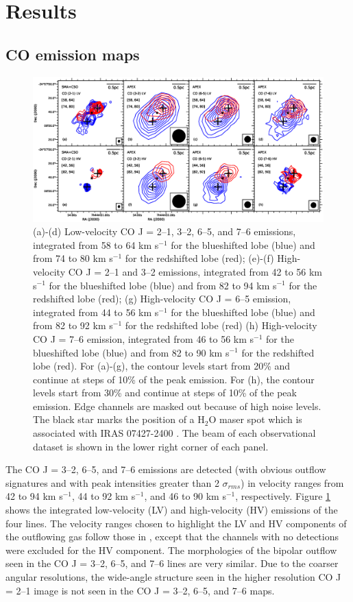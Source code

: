 \section{Results}
\subsection{CO emission maps}

\begin{figure}[htbp]
\includegraphics[scale=.65]{./fig/ori_contourall.eps}
\caption{(a)-(d) Low-velocity CO J = 2--1, 3--2, 6--5, and 7--6 emissions, integrated from 58 to 64 km s$^{-1} $ for the blueshifted lobe (blue) and from 74 to 80 km s$^{-1}$ for the redshifted lobe (red); (e)-(f) High-velocity CO J = 2--1 and 3--2 emissions,  integrated from 42 to 56 km s$^{-1} $ for the blueshifted lobe (blue) and from 82 to 94 km s$^{-1}$ for the redshifted lobe (red); (g) High-velocity CO J = 6--5 emission, integrated from 44 to 56 km s$^{-1} $ for the blueshifted lobe (blue) and from 82 to 92 km s$^{-1}$ for the redshifted lobe (red) (h) High-velocity CO J = 7--6 emission, integrated from 46 to 56 km s$^{-1} $ for the blueshifted lobe (blue) and from 82 to 90 km s$^{-1}$ for the redshifted lobe (red). For (a)-(g), the contour levels start from 20\% and continue at steps of 10\% of the peak emission. For (h), the contour levels start from 30\% and continue at steps of 10\% of the peak emission. Edge channels are masked out because of high noise levels. The black star marks the position of a H$_2$O maser spot which is associated with IRAS 07427-2400 \citep{2015PASJ...67...69S}. The beam of each observational dataset is shown in the lower right corner of each panel. \label{fig:figcontour}}
\end{figure}

The CO J = 3--2, 6--5, and 7--6 emissions are detected (with obvious outflow signatures and with peak intensities greater than 2 $\sigma_{rms}$) in velocity ranges from 42 to 94 km s$^{-1}$, 44 to 92 km s$^{-1}$, and 46 to 90 km s$^{-1}$, respectively. Figure \ref{fig:figcontour} shows the integrated low-velocity (LV) and high-velocity (HV) emissions of the four lines. The velocity ranges chosen to highlight the LV and HV components of the outflowing gas follow those in \citet{2009ApJ...696...66Q}, except that the channels with no detections were excluded for the HV component. The morphologies of the bipolar outflow seen in the CO J = 3--2, 6--5, and 7--6 lines are very similar. Due to the coarser angular resolutions, the wide-angle structure seen in the higher resolution CO J = 2--1 image is not seen in the CO J = 3--2, 6--5, and 7--6 maps.

